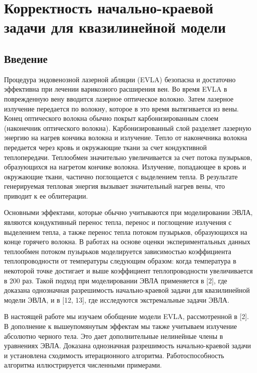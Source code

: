 \section{
    Корректность начально-краевой задачи для квазилинейной модели
}\label{sec:ch3:sec1}

\subsection{Введение}\label{subsec:ch3:sec1:subsec1}
Процедура эндовенозной лазерной абляции (EVLA) безопасна и достаточно эффективна при
лечении варикозного расширения вен.
Во время EVLA в поврежденную вену вводится лазерное оптическое волокно.
Затем лазерное излучение передается по волокну, которое в это время вытягивается из вены.
Конец оптического волокна обычно покрыт карбонизированным слоем (наконечник оптического волокна).
Карбонизированный слой разделяет лазерную энергию на нагрев кончика волокна и излучение.
Тепло от наконечника волокна передается через кровь и окружающие ткани за счет кондуктивной теплопередачи.
Теплообмен значительно увеличивается за счет потока пузырьков, образующихся на нагретом кончике волокна.
Излучение, попадающее в кровь и окружающие ткани, частично поглощается с выделением тепла.
В результате генерируемая тепловая энергия вызывает значительный нагрев вены, что приводит к ее облитерации.

Основными эффектами, которые обычно учитываются при моделировании ЭВЛА, являются кондуктивный перенос тепла,
перенос и поглощение излучения с выделением тепла, а также перенос тепла потоком пузырьков, образующихся
на конце горячего волокна.
В работах на основе оценки экспериментальных данных теплообмен потоком пузырьков моделируется
зависимостью коэффициента теплопроводности от температуры следующим образом: когда температура
в некоторой точке достигает и выше коэффициент теплопроводности увеличивается в 200 раз.
Такой подход при моделировании ЭВЛА применяется в [2], где доказана однозначная разрешимость
начально-краевой задачи для квазилинейной модели ЭВЛА, и в [12, 13], где исследуются экстремальные задачи ЭВЛА.

В настоящей работе мы изучаем обобщение модели EVLA, рассмотренной в [2].
В дополнение к вышеупомянутым эффектам мы также учитываем излучение абсолютно черного тела.
Это дает дополнительные нелинейные члены в уравнениях ЭВЛА. Доказана однозначная разрешимость
начально-краевой задачи и установлена сходимость итерационного алгоритма.
Работоспособность алгоритма иллюстрируется численными примерами.

